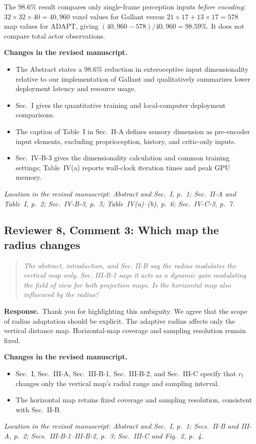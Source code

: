 \documentclass[11pt]{article}
\newenvironment{reviewcomment}{\begin{quote}\color{reviewblue}\itshape}{\end{quote}}
\newcommand{\Response}{\par\noindent\textbf{Response.}\ }
\newcommand{\Changes}{\par\noindent\textbf{Changes in the revised manuscript.}\ }
\newcommand{\Location}[1]{\par\noindent\textit{Location in the revised manuscript: #1}}
\begin{document}
The 98.6\% result compares only single-frame perception inputs \emph{before encoding}: $32\times32\times40=40{,}960$ voxel values for Gallant versus $21\times17+13\times17=578$ map values for ADAPT, giving $(40{,}960-578)/40{,}960=98.59\%$. It does not compare total actor observations.
\Changes
\begin{itemize}
    \item The Abstract states a 98.6\% reduction in exteroceptive input dimensionality relative to our implementation of Gallant and qualitatively summarizes lower deployment latency and resource usage.
    \item Sec.~I gives the quantitative training and local-computer deployment comparisons.
    \item The caption of Table~I in Sec.~II-A defines sensory dimension as pre-encoder input elements, excluding proprioception, history, and critic-only inputs.
    \item Sec.~IV-B-3 gives the dimensionality calculation and common training settings; Table~IV(a) reports wall-clock iteration times and peak GPU memory.
\end{itemize}
\Location{Abstract and Sec.~I, p.~1; Sec.~II-A and Table~I, p.~2; Sec.~IV-B-3, p.~5; Table~IV(a)--(b), p.~6; Sec.~IV-C-3, p.~7.}



\subsection*{Reviewer 8, Comment 3: Which map the radius changes}
\begin{reviewcomment}
The abstract, introduction, and Sec. II-B say the radius modulates the vertical map only. Sec. III-B-1 says it acts as a dynamic gain modulating the field of view for both projection maps. Is the horizontal map also influenced by the radius?
\end{reviewcomment}
\Response Thank you for highlighting this ambiguity. We agree that the scope of radius adaptation should be explicit. The adaptive radius affects only the vertical distance map. Horizontal-map coverage and sampling resolution remain fixed.
\Changes
\begin{itemize}
    \item Sec.~I, Sec.~III-A, Sec.~III-B-1, Sec.~III-B-2, and Sec.~III-C specify that $r_t$ changes only the vertical map's radial range and sampling interval.
    \item The horizontal map retains fixed coverage and sampling resolution, consistent with Sec.~II-B.
\end{itemize}
\Location{Abstract and Sec.~I, p.~1; Secs.~II-B and III-A, p.~2; Secs.~III-B-1--III-B-2, p.~3; Sec.~III-C and Fig.~2, p.~4.}
\end{document}
